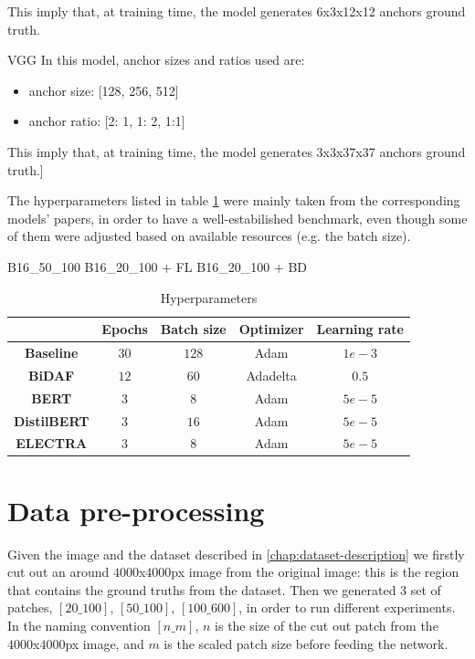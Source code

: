 \documentclass[a4paper,10pt]{report}
\begin{document}
This imply that, at training time, the model generates 6x3x12x12 anchors ground truth.

VGG
In this model, anchor sizes and ratios used are:
\begin{itemize}
  \item anchor size: [128, 256, 512]
  \item anchor ratio: [2: 1, 1: 2, 1:1]
\end{itemize}

This imply that, at training time, the model generates 3x3x37x37 anchors ground truth.]

The hyperparameters listed in table \ref{table:hyperparameters} were mainly taken from the corresponding models' papers, in order to have a well-estabilished benchmark, even though some of them were adjusted based on available resources (e.g. the batch size).

B16_50_100
B16_20_100 + FL
B16_20_100 + BD

\begin{table}[h]
  \center
  \begin{tabular}{|c|c|c|c|c|}
    \hline
                        & \textbf{Epochs} & \textbf{Batch size} & \textbf{Optimizer} & \textbf{Learning rate} \\ \hline
    \textbf{Baseline}   & $30$            & $128$               & Adam               & $1e-3$                 \\ \hline
    \textbf{BiDAF}      & $12$            & $60$                & Adadelta           & $0.5$                  \\ \hline
    \textbf{BERT}       & $3$             & $8$                 & Adam               & $5e-5$                 \\ \hline
    \textbf{DistilBERT} & $3$             & $16$                & Adam               & $5e-5$                 \\ \hline
    \textbf{ELECTRA}    & $3$             & $8$                 & Adam               & $5e-5$                 \\ \hline
  \end{tabular}
  \caption{Hyperparameters}
  \label{table:hyperparameters}
\end{table}
 
\section{Data pre-processing}\label{sec:data-handling}
Given the image and the dataset described in \ref{chap:dataset-description} we firstly cut out an around $4000$x$4000$px image from the original image: this is the region that contains the ground truths from the dataset.
Then we generated 3 set of patches, $[20\_100]$, $[50\_100]$, $[100\_600]$, in order to run different experiments. In the naming convention $[n\_m]$, $n$ is the size of the cut out patch from the $4000$x$4000$px image, and $m$ is the scaled patch size before feeding the network.
\end{document}
